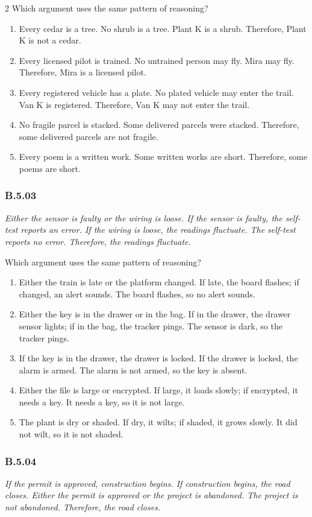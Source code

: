 \documentclass[10pt]{extarticle}
\newcommand{\choice}[1]{\item #1}
\newcommand{\bankitem}[1]{\subsubsection*{#1}}
\begin{document}
\begin{multicols}{2}
Which argument uses the same pattern of reasoning?
\begin{enumerate}[label=(\alph*)]
  \choice{Every cedar is a tree. No shrub is a tree. Plant K is a shrub. Therefore, Plant K is not a cedar.}
  \choice{Every licensed pilot is trained. No untrained person may fly. Mira may fly. Therefore, Mira is a licensed pilot.}
  \choice{Every registered vehicle has a plate. No plated vehicle may enter the trail. Van K is registered. Therefore, Van K may not enter the trail.}
  \choice{No fragile parcel is stacked. Some delivered parcels were stacked. Therefore, some delivered parcels are not fragile.}
  \choice{Every poem is a written work. Some written works are short. Therefore, some poems are short.}
\end{enumerate}
\bankitem{B.5.03}
\emph{Either the sensor is faulty or the wiring is loose. If the sensor is faulty, the self-test reports an error. If the wiring is loose, the readings fluctuate. The self-test reports no error. Therefore, the readings fluctuate.}

Which argument uses the same pattern of reasoning?
\begin{enumerate}[label=(\alph*)]
  \choice{Either the train is late or the platform changed. If late, the board flashes; if changed, an alert sounds. The board flashes, so no alert sounds.}
  \choice{Either the key is in the drawer or in the bag. If in the drawer, the drawer sensor lights; if in the bag, the tracker pings. The sensor is dark, so the tracker pings.}
  \choice{If the key is in the drawer, the drawer is locked. If the drawer is locked, the alarm is armed. The alarm is not armed, so the key is absent.}
  \choice{Either the file is large or encrypted. If large, it loads slowly; if encrypted, it needs a key. It needs a key, so it is not large.}
  \choice{The plant is dry or shaded. If dry, it wilts; if shaded, it grows slowly. It did not wilt, so it is not shaded.}
\end{enumerate}
\bankitem{B.5.04}
\emph{If the permit is approved, construction begins. If construction begins, the road closes. Either the permit is approved or the project is abandoned. The project is not abandoned. Therefore, the road closes.}


\end{multicols}
\end{document}
